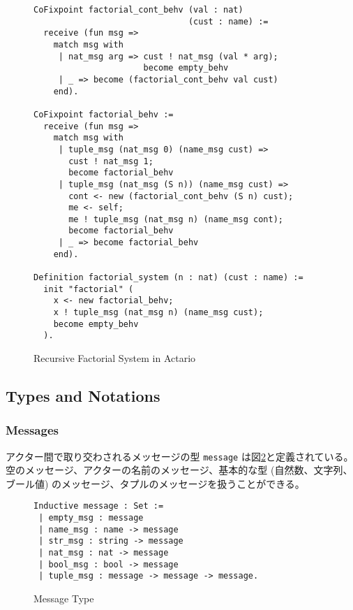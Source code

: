 \begin{figure}[t]
\begin{lstlisting}[style=small]
CoFixpoint factorial_cont_behv (val : nat)
                               (cust : name) :=
  receive (fun msg =>
    match msg with
     | nat_msg arg => cust ! nat_msg (val * arg);
                      become empty_behv
     | _ => become (factorial_cont_behv val cust)
    end).

CoFixpoint factorial_behv :=
  receive (fun msg =>
    match msg with
     | tuple_msg (nat_msg 0) (name_msg cust) =>
       cust ! nat_msg 1;
       become factorial_behv
     | tuple_msg (nat_msg (S n)) (name_msg cust) =>
       cont <- new (factorial_cont_behv (S n) cust);
       me <- self;
       me ! tuple_msg (nat_msg n) (name_msg cont);
       become factorial_behv
     | _ => become factorial_behv
    end).

Definition factorial_system (n : nat) (cust : name) :=
  init "factorial" (
    x <- new factorial_behv;
    x ! tuple_msg (nat_msg n) (name_msg cust);
    become empty_behv
  ).
\end{lstlisting}
\caption{Recursive Factorial System in Actario}\label{coq:fact}
\end{figure}



\subsection{Types and Notations}

\subsubsection{Messages}
アクター間で取り交わされるメッセージの型 \texttt{message} は図\ref{coq:message}と定義されている。
空のメッセージ、アクターの名前のメッセージ、基本的な型 (自然数、文字列、ブール値) のメッセージ、タプルのメッセージを扱うことができる。

\begin{figure}[tb]
\begin{lstlisting}
Inductive message : Set :=
 | empty_msg : message
 | name_msg : name -> message
 | str_msg : string -> message
 | nat_msg : nat -> message
 | bool_msg : bool -> message
 | tuple_msg : message -> message -> message.
\end{lstlisting}
\caption{Message Type}\label{coq:message}
\end{figure}


